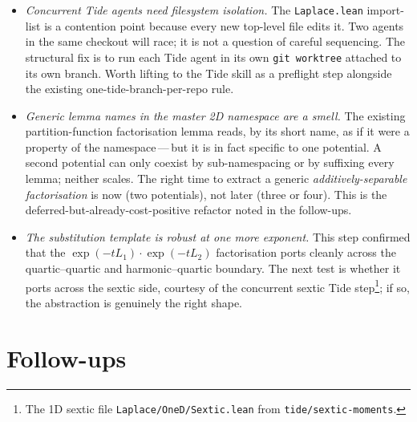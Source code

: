 \documentclass[11pt]{article}
\begin{document}
\begin{itemize}
\item \emph{Concurrent Tide agents need filesystem isolation.} The
\texttt{Laplace.lean} import-list is a contention point because every
new top-level file edits it. Two agents in the same checkout will race;
it is not a question of careful sequencing. The structural fix is to
run each Tide agent in its own \texttt{git worktree} attached to its
own branch. Worth lifting to the Tide skill as a preflight step
alongside the existing one-tide-branch-per-repo rule.

\item \emph{Generic lemma names in the master 2D namespace are a
smell.} The existing partition-function factorisation lemma reads, by
its short name, as if it were a property of the
namespace\,---\,but it is in fact specific to one potential. A second
potential can only coexist by sub-namespacing or by suffixing every
lemma; neither scales. The right time to extract a generic
\emph{additively-separable factorisation} is now (two potentials), not
later (three or four). This is the deferred-but-already-cost-positive
refactor noted in the follow-ups.

\item \emph{The substitution template is robust at one more
exponent.} This step confirmed that the
$\exp(-tL_1) \cdot \exp(-tL_2)$ factorisation ports cleanly across the
quartic--quartic and harmonic--quartic boundary. The next test is
whether it ports across the sextic side, courtesy of the concurrent
sextic Tide step\footnote{The 1D sextic file
\texttt{Laplace/OneD/Sextic.lean} from
\texttt{tide/sextic-moments}.}; if so, the abstraction is genuinely
the right shape.
\end{itemize}

\section{Follow-ups}
\end{document}
